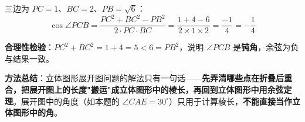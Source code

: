 \begin{answer}
三边为 $PC=1$、$BC=2$、$PB=\sqrt6$：
\nopagebreak[4]
\[\cos\angle PCB=\frac{PC^{2}+BC^{2}-PB^{2}}{2\cdot PC\cdot BC}=\frac{1+4-6}{2\times1\times2}=\frac{-1}4=-\frac14\]

\begin{gktip}
\textbf{合理性检验}：$PC^{2}+BC^{2}=1+4=5<6=PB^{2}$，说明 $\angle PCB$ 是\textbf{钝角}，余弦为负  与结果一致。

\textbf{方法总结}：立体图形展开图问题的解法只有一句话——\textbf{先弄清哪些点在折叠后重合，把展开图上的长度"搬运"成立体图形中的棱长，再回到立体图形中用余弦定理}。展开图中的角度（如本题的 $\angle CAE=30^\circ$）只用于计算棱长，\textbf{不能直接当作立体图形中的角}。
\end{gktip}


\par\medskip

\end{answer}

